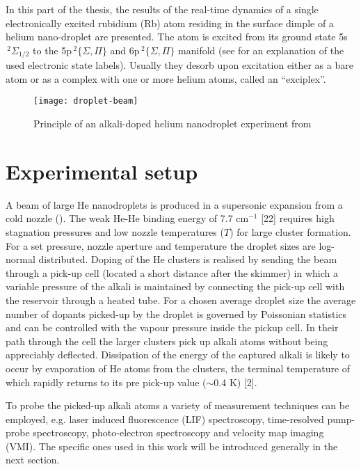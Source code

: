 	In this part of the thesis, the results of the real-time dynamics of a single electronically excited rubidium (Rb) atom residing in the surface dimple of a helium nano-droplet are presented. The atom is excited from its ground state 5s$\,^2\Sigma_{1/2}$ to the 5p$\,^2\{\Sigma,\Pi\}$ and 6p$\,^2\{\Sigma,\Pi\}$ manifold (see  for an explanation of the used electronic state labels). Usually they desorb upon excitation either as a bare atom or as a complex with one or more helium atoms, called an ``exciplex''.	
	\begin{figure}[t]
		\begin{center}
			\texttt{[image: droplet-beam]}
			\caption{Principle of an alkali-doped helium nanodroplet experiment from}
			\label{fig:droplet-beam}
		\end{center}
	\end{figure}
	
	\section*{Experimental setup}
	A beam of large He nanodroplets is produced in a supersonic expansion from a cold nozzle (). The weak He-He binding energy of 7.7 cm$^{-1}$ [22] requires high stagnation pressures and low nozzle temperatures ($T$) for large cluster formation. For a set pressure, nozzle aperture and temperature the droplet sizes are log-normal distributed. Doping of the He clusters is realised by sending the beam through a pick-up cell (located a short distance after the skimmer) in which a variable pressure of the alkali is maintained by connecting the pick-up cell with the reservoir through a heated tube. For a chosen average droplet size the average number of dopants picked-up by the droplet is governed by Poissonian statistics and can be controlled with the vapour pressure inside the pickup cell. In their path through the cell the larger clusters pick up alkali atoms without being appreciably deflected. Dissipation of the energy of the captured alkali is likely to occur by evaporation of He atoms from the clusters, the terminal temperature of which rapidly returns to its pre pick-up value ($\sim$0.4 K) [2].

	To probe the picked-up alkali atoms a variety of measurement techniques can be employed, e.g. laser induced fluorescence (LIF) spectroscopy, time-resolved pump-probe spectroscopy, photo-electron spectroscopy and velocity map imaging (VMI). The specific ones used in this work will be introduced generally in the next section.%
\clearpage{\pagestyle{empty}\cleardoublepage}